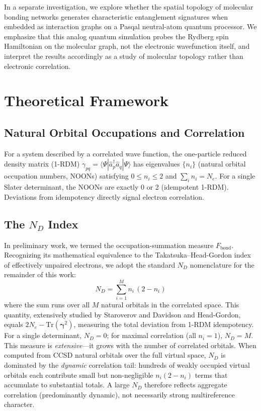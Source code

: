 \documentclass[12pt,a4paper]{article}
\begin{document}
In a separate investigation, we explore whether the spatial topology
of molecular bonding networks generates characteristic entanglement
signatures when embedded as interaction graphs on a Pasqal neutral-atom
quantum processor. We emphasize that this analog quantum simulation
probes the Rydberg spin Hamiltonian on the molecular graph, not the
electronic wavefunction itself, and interpret the results accordingly
as a study of molecular topology rather than electronic correlation.

\section{Theoretical Framework}

\subsection{Natural Orbital Occupations and Correlation}

For a system described by a correlated wave function, the one-particle reduced
density matrix (1-RDM) $\gamma_{pq} = \langle \Psi | \hat{a}_p^\dagger \hat{a}_q | \Psi \rangle$
has eigenvalues $\{n_i\}$ (natural orbital occupation numbers, NOONs) satisfying
$0 \leq n_i \leq 2$ and $\sum_i n_i = N_e$.\cite{lowdin1955}
For a single Slater determinant, the NOONs are exactly 0 or 2 (idempotent 1-RDM).
Deviations from idempotency directly signal electron correlation.

\subsection{The $N_D$ Index}

In preliminary work, we termed the occupation-summation measure
$F_{\text{bond}}$.\cite{arda2025fbond} Recognizing its mathematical
equivalence to the Takatsuka--Head-Gordon index of effectively
unpaired electrons,\cite{takatsuka1978,headgordon2003} we adopt the
standard $N_D$ nomenclature for the remainder of this work:
\begin{equation}
  N_D
    = \sum_{i=1}^{M} n_i\,(2 - n_i)
  \label{eq:ND}
\end{equation}
where the sum runs over all $M$ natural orbitals in the correlated space.
This quantity, extensively studied by Staroverov and
Davidson\cite{staroverov2000} and Head-Gordon,\cite{headgordon2003}
equals $2N_e - \mathrm{Tr}(\boldsymbol{\gamma}^2)$,
measuring the total deviation from 1-RDM idempotency.
For a single determinant, $N_D = 0$;
for maximal correlation (all $n_i = 1$), $N_D = M$.
This measure is \emph{extensive}---it grows with the number of correlated
orbitals. When computed from CCSD natural orbitals over the full virtual space,
$N_D$ is dominated by the \emph{dynamic} correlation tail: hundreds of weakly
occupied virtual orbitals each contribute small but non-negligible
$n_i(2-n_i)$ terms that accumulate to substantial totals. A large $N_D$
therefore reflects aggregate correlation (predominantly dynamic), not
necessarily strong multireference character.
\end{document}
